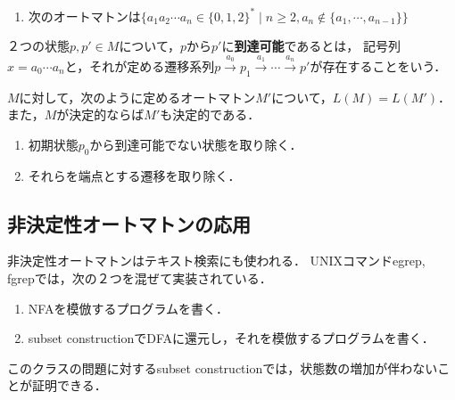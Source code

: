 \begin{example}
\begin{enumerate}
\begin{center}
        \end{center}
        \item 次のオートマトンは$\{a_1a_2\cdots a_n\in\{0,1,2\}^*\mid n\ge 2,a_n\notin\{a_1,\cdots,a_{n-1}\}\}$
    \end{enumerate}
\end{example}

\begin{definition}[accessible]\label{def-accessibility-of-states}
    ２つの状態$p,p'\in M$について，$p$から$p'$に\textbf{到達可能}であるとは，
    記号列$x=a_0\cdots a_n$と，それが定める遷移系列$p\xrightarrow{a_0}p_1\xrightarrow{a_1}\cdots\xrightarrow{a_n}p'$が存在することをいう．
\end{definition}

\begin{proposition}
    $M$に対して，次のように定めるオートマトン$M'$について，$L(M)=L(M')$．
    また，$M$が決定的ならば$M'$も決定的である．
    \begin{enumerate}
        \item 初期状態$p_0$から到達可能でない状態を取り除く．
        \item それらを端点とする遷移を取り除く．
    \end{enumerate}
\end{proposition}

\subsection{非決定性オートマトンの応用}

\begin{application}
    非決定性オートマトンはテキスト検索にも使われる．
    UNIXコマンドegrep, fgrepでは，次の２つを混ぜて実装されている．
    \begin{enumerate}
        \item NFAを模倣するプログラムを書く．
        \item subset constructionでDFAに還元し，それを模倣するプログラムを書く．
    \end{enumerate}
    このクラスの問題に対するsubset constructionでは，状態数の増加が伴わないことが証明できる．
\end{application}

